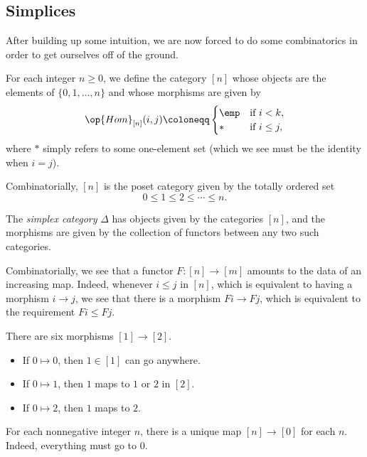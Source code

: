 \documentclass[../notes.tex]{subfiles}
\begin{document}
\subsection{Simplices}
After building up some intuition, we are now forced to do some combinatorics in order to get ourselves off of the ground.
\begin{notation}
	For each integer $n\ge0$, we define the category $[n]$ whose objects are the elements of $\{0,1,\ldots,n\}$ and whose morphisms are given by
	\[\op{Hom}_{[n]}(i,j)\coloneqq\begin{cases}
		\emp & \text{if }i<k, \\
		* & \text{if }i\le j,
	\end{cases}\]
	where $*$ simply refers to some one-element set (which we see must be the identity when $i=j$).
\end{notation}
\begin{remark}
	Combinatorially, $[n]$ is the poset category given by the totally ordered set
	\[0\le 1\le2\le\cdots\le n.\]
\end{remark}
\begin{definition}[simplex]
	The \textit{simplex category} $\Delta$ has objects given by the categories $[n]$, and the morphisms are given by the collection of functors between any two such categories.
\end{definition}
\begin{remark}
	Combinatorially, we see that a functor $F\colon[n]\to[m]$ amounts to the data of an increasing map. Indeed, whenever $i\le j$ in $[n]$, which is equivalent to having a morphism $i\to j$, we see that there is a morphism $Fi\to Fj$, which is equivalent to the requirement $Fi\le Fj$.
\end{remark}
\begin{example}
	There are six morphisms $[1]\to[2]$.
	\begin{itemize}
		\item If $0\mapsto0$, then $1\in[1]$ can go anywhere.
		\item If $0\mapsto1$, then $1$ maps to $1$ or $2$ in $[2]$.
		\item If $0\mapsto2$, then $1$ maps to $2$.
	\end{itemize}
\end{example}
\begin{example}
	For each nonnegative integer $n$, there is a unique map $[n]\to[0]$ for each $n$. Indeed, everything must go to $0$.
\end{example}
\end{document}

